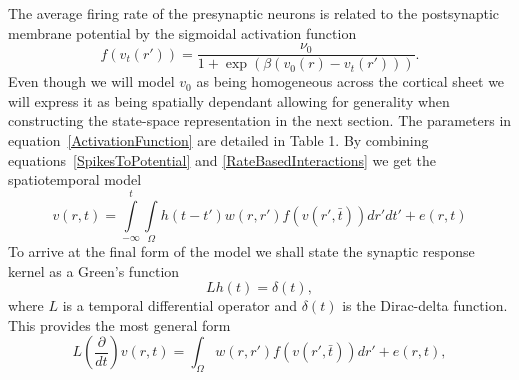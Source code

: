 \documentclass[onecolumn,draftcls]{IEEEtran}
\begin{document}
The average firing rate of the presynaptic neurons is related to the postsynaptic membrane potential by the sigmoidal activation function
\begin{equation}\label{ActivationFunction}
f\left( {{v_t}\left( {r'} \right)} \right) = \frac{{{\nu _0}}}{{1 + \exp \left( {\beta \left( {{v_0}\left( r \right) - {v_t}\left( {r'} \right)} \right)} \right)}}.
\end{equation}
Even though we will model  $v_0$ as being homogeneous across the cortical sheet we will express it as being spatially dependant allowing for generality when constructing the state-space representation in the next section. The parameters in equation~\ref{ActivationFunction} are detailed in Table 1. By combining equations~\ref{SpikesToPotential} and \ref{RateBasedInteractions} we get the spatiotemporal model
\begin{equation}\label{FullDoubleIntModel}
v\left(r,t\right) = \int\limits_{-\infty}^t\int\limits_\Omega  h\left(t - t'\right)w\left(r,r'\right)f\left( v\left( r',\bar t \right)\right)dr' dt'+e\left(r,t\right)
\end{equation}
To arrive at the final form of the model we shall state the synaptic response kernel as a Green's function
\begin{equation}\label{GreensFuncDef}
Lh\left( t \right) = \delta \left( t \right),
\end{equation}
where $L$ is a temporal differential operator and $\delta(t)$ is the Dirac-delta function. This provides the most general form
\begin{equation}\label{GenForm}
L\left( {\frac{\partial }{{dt}}} \right)v\left( {r,t} \right) = \int_\Omega  {w\left( {r,r'} \right)f\left( {v\left( {r',\bar t} \right)} \right)dr'}  + e\left( {r,t} \right),
\end{equation}
\end{document}
